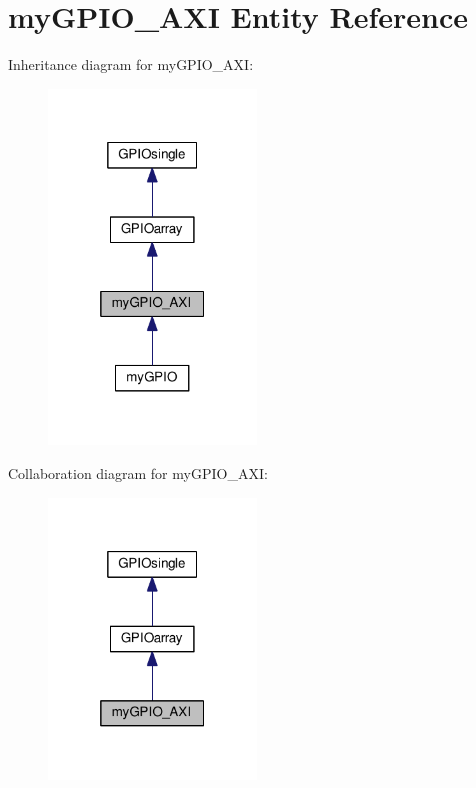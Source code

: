 \hypertarget{classmy_g_p_i_o___a_x_i}{\section{my\+G\+P\+I\+O\+\_\+\+A\+X\+I Entity Reference}
\label{classmy_g_p_i_o___a_x_i}
}


Inheritance diagram for my\+G\+P\+I\+O\+\_\+\+A\+X\+I\+:
\nopagebreak
\begin{figure}[H]
\begin{center}
\leavevmode
\includegraphics[width=157pt]{classmy_g_p_i_o___a_x_i__inherit__graph}
\end{center}
\end{figure}


Collaboration diagram for my\+G\+P\+I\+O\+\_\+\+A\+X\+I\+:
\nopagebreak
\begin{figure}[H]
\begin{center}
\leavevmode
\includegraphics[width=157pt]{classmy_g_p_i_o___a_x_i__coll__graph}
\end{center}
\end{figure}
